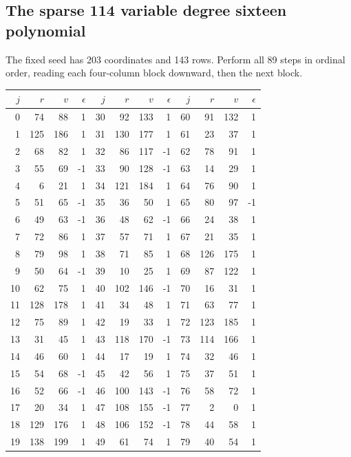 \subsection{The sparse 114 variable degree sixteen polynomial}
The fixed seed has 203 coordinates and 143 rows. Perform all 89 steps in ordinal order, reading each four-column block downward, then the next block.
\begin{center}\small\setlength{\tabcolsep}{5pt}
\begin{tabular}{@{}rrrr@{\quad}rrrr@{\quad}rrrr@{}}\toprule
$j$&$r$&$v$&$\epsilon$&$j$&$r$&$v$&$\epsilon$&$j$&$r$&$v$&$\epsilon$\\\midrule
0 & 74 & 88 & 1 & 30 & 92 & 133 & 1 & 60 & 91 & 132 & 1\\
1 & 125 & 186 & 1 & 31 & 130 & 177 & 1 & 61 & 23 & 37 & 1\\
2 & 68 & 82 & 1 & 32 & 86 & 117 & -1 & 62 & 78 & 91 & 1\\
3 & 55 & 69 & -1 & 33 & 90 & 128 & -1 & 63 & 14 & 29 & 1\\
4 & 6 & 21 & 1 & 34 & 121 & 184 & 1 & 64 & 76 & 90 & 1\\
5 & 51 & 65 & -1 & 35 & 36 & 50 & 1 & 65 & 80 & 97 & -1\\
6 & 49 & 63 & -1 & 36 & 48 & 62 & -1 & 66 & 24 & 38 & 1\\
7 & 72 & 86 & 1 & 37 & 57 & 71 & 1 & 67 & 21 & 35 & 1\\
8 & 79 & 98 & 1 & 38 & 71 & 85 & 1 & 68 & 126 & 175 & 1\\
9 & 50 & 64 & -1 & 39 & 10 & 25 & 1 & 69 & 87 & 122 & 1\\
10 & 62 & 75 & 1 & 40 & 102 & 146 & -1 & 70 & 16 & 31 & 1\\
11 & 128 & 178 & 1 & 41 & 34 & 48 & 1 & 71 & 63 & 77 & 1\\
12 & 75 & 89 & 1 & 42 & 19 & 33 & 1 & 72 & 123 & 185 & 1\\
13 & 31 & 45 & 1 & 43 & 118 & 170 & -1 & 73 & 114 & 166 & 1\\
14 & 46 & 60 & 1 & 44 & 17 & 19 & 1 & 74 & 32 & 46 & 1\\
15 & 54 & 68 & -1 & 45 & 42 & 56 & 1 & 75 & 37 & 51 & 1\\
16 & 52 & 66 & -1 & 46 & 100 & 143 & -1 & 76 & 58 & 72 & 1\\
17 & 20 & 34 & 1 & 47 & 108 & 155 & -1 & 77 & 2 & 0 & 1\\
18 & 129 & 176 & 1 & 48 & 106 & 152 & -1 & 78 & 44 & 58 & 1\\
19 & 138 & 199 & 1 & 49 & 61 & 74 & 1 & 79 & 40 & 54 & 1\\

\end{tabular}
\end{center}
